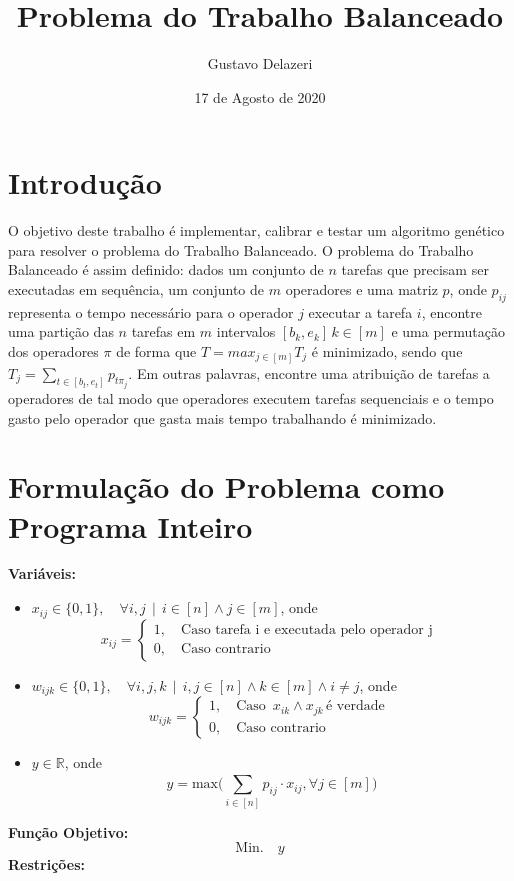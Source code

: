 \documentclass{article}
\title{Problema do Trabalho Balanceado}
\author{Gustavo Delazeri}
\date{17 de Agosto de 2020}
\begin{document}
\maketitle

\section{Introdução}
O objetivo deste trabalho é implementar, calibrar e testar um algoritmo genético para resolver o problema do Trabalho Balanceado. 
O problema do Trabalho Balanceado é assim definido: dados um conjunto de $n$ tarefas que precisam ser executadas em sequência, um conjunto de $m$ operadores e uma matriz $p$, onde $p_{ij}$ representa o tempo necessário para o operador $j$ executar a tarefa $i$, encontre  uma partição das $n$ tarefas em $m$ intervalos $[b_{k}, e_{k}] \, k \in [m] $ e uma permutação dos
operadores $\pi$ de forma que  $T =  max_{j \in [m]} T_{j}$ é minimizado, sendo que $T_{j} = \sum_{t \in [b_{t}, e_{t}]}{} p_{t\pi_{j}} $. Em outras palavras, encontre uma atribuição de tarefas a operadores de tal modo que operadores executem tarefas sequenciais e o tempo gasto pelo operador que gasta mais tempo trabalhando é minimizado. 
\section{Formulação do Problema como Programa Inteiro}
\textbf{Variáveis:} 
\begin{itemize}
  \item $x_{ij} \in \{0, 1\}, \quad \forall i,j  \, \mid  \, i \in [n] \land j \in [m]$, onde
  	$$x_{ij} = 
	\begin{cases}
	1,  \quad  \text{Caso tarefa i e executada pelo operador j } \\
	0,  \quad  \text{Caso contrario}
	\end{cases}
	$$
  \item $w_{ijk} \in \{0, 1\}, \quad \forall i,j,k  \, \mid \,  i,j \in [n]  \land k \in [m] \land i \neq j$, onde
  	$$w_{ijk} = 
	\begin{cases}
	1,  \quad  \text{Caso } \,  x_{ik} \land x_{jk} \, \text{é verdade }\\
	0,  \quad  \text{Caso contrario}
	\end{cases}
	$$
	
  \item $y \in \mathbb{R}$, onde
  	$$y = \text{max}\Bigg(\sum_{i \in [n] }^{} p_{ij} \cdot x_{ij},   \forall j \in [m] \Bigg)	$$
\end{itemize}
\textbf{Função Objetivo:} 
	$$\text{Min.} \quad y$$
\textbf{Restrições:} 
\end{document}

